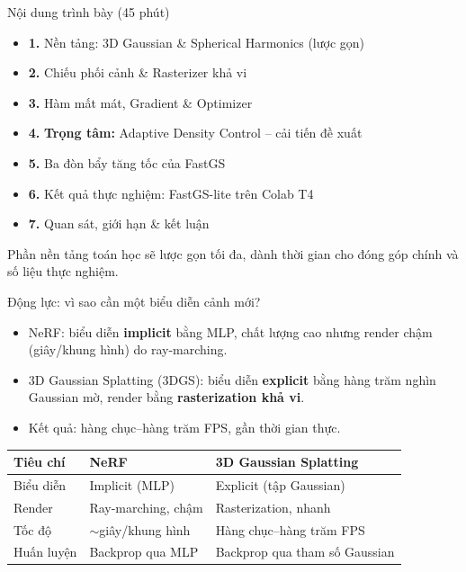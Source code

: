 
\begin{frame}
\titlepage
\end{frame}

\begin{frame}{Nội dung trình bày (45 phút)}
\begin{itemize}
    \item \textbf{1.} Nền tảng: 3D Gaussian \& Spherical Harmonics (lược gọn)
    \item \textbf{2.} Chiếu phối cảnh \& Rasterizer khả vi
    \item \textbf{3.} Hàm mất mát, Gradient \& Optimizer
    \item \textbf{4.} \textbf{Trọng tâm:} Adaptive Density Control -- cải tiến đề xuất
    \item \textbf{5.} Ba đòn bẩy tăng tốc của FastGS
    \item \textbf{6.} Kết quả thực nghiệm: FastGS-lite trên Colab T4
    \item \textbf{7.} Quan sát, giới hạn \& kết luận
\end{itemize}
\vspace{0.3cm}
\small
Phần nền tảng toán học sẽ lược gọn tối đa, dành thời gian cho đóng góp chính và số liệu thực nghiệm.
\end{frame}

\begin{frame}{Động lực: vì sao cần một biểu diễn cảnh mới?}
\begin{itemize}
    \item NeRF: biểu diễn \textbf{implicit} bằng MLP, chất lượng cao nhưng render chậm (giây/khung hình) do ray-marching.
    \item 3D Gaussian Splatting (3DGS): biểu diễn \textbf{explicit} bằng hàng trăm nghìn Gaussian mờ, render bằng \textbf{rasterization khả vi}.
    \item Kết quả: hàng chục--hàng trăm FPS, gần thời gian thực.
\end{itemize}
\vspace{0.3cm}
\small
\centering
\begin{tabular}{lll}
\toprule
\textbf{Tiêu chí} & \textbf{NeRF} & \textbf{3D Gaussian Splatting} \\
\midrule
Biểu diễn & Implicit (MLP) & Explicit (tập Gaussian) \\
Render & Ray-marching, chậm & Rasterization, nhanh \\
Tốc độ & $\sim$giây/khung hình & Hàng chục--hàng trăm FPS \\
Huấn luyện & Backprop qua MLP & Backprop qua tham số Gaussian \\
\bottomrule
\end{tabular}
\end{frame}

